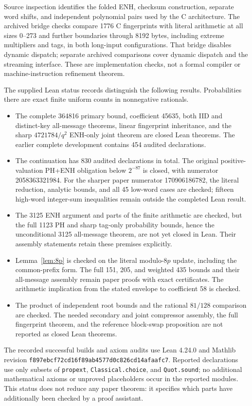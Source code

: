 Source inspection identifies the folded ENH, checksum construction, separate word shifts, and independent polynomial pairs used by the C architecture. The archived bridge checks compare 1776 C fingerprints with literal arithmetic at all sizes 0--273 and further boundaries through 8192 bytes, including extreme multipliers and tags, in both long-input configurations. That bridge disables dynamic dispatch; separate archived comparisons cover dynamic dispatch and the streaming interface. These are implementation checks, not a formal compiler or machine-instruction refinement theorem.

The supplied Lean status records\cite{leanstatus} distinguish the following results. Probabilities there are exact finite uniform counts in nonnegative rationals.
\begin{itemize}
\item The complete 364816 primary bound, coefficient 45635, both IID and distinct-key all-message theorems, linear fingerprint inheritance, and the sharp $4721784/q^2$ ENH-only joint theorem are closed Lean theorems. The earlier complete development contains 454 audited declarations.
\item The continuation has 830 audited declarations in total. The original positive-valuation PH+ENH obligation below $2^{-87}$ is closed, with numerator 2058363321984. For the sharper paper numerator 170906186782, the literal reduction, analytic bounds, and all 45 low-word cases are checked; fifteen high-word integer-sum inequalities remain outside the completed Lean result.
\item The 3125 ENH argument and parts of the finite arithmetic are checked, but the full 1123 PH and sharp tag-only probability bounds, hence the unconditional 3125 all-message theorem, are not yet closed in Lean. Their assembly statements retain these premises explicitly.
\item Lemma~\ref{lem:8p} is checked on the literal modulo-$8p$ update, including the common-prefix form. The full 151, 205, and weighted 435 bounds and their all-message assembly remain paper proofs with exact certificates. The arithmetic implication from the stated envelope to coefficient 58 is checked.
\item The product of independent root bounds and the rational $81/128$ comparison are checked. The needed secondary and joint compressor assembly, the full fingerprint theorem, and the reference block-swap proposition are not reported as closed Lean theorems.
\end{itemize}
The recorded successful builds and axiom audits use Lean 4.24.0 and Mathlib revision \texttt{f897ebcf72cd16f8}\allowbreak\texttt{9ab4577d0c826cd14afaafc7}. Reported declarations use only subsets of \texttt{propext}, \texttt{Classical.choice}, and \texttt{Quot.sound}; no additional mathematical axioms or unproved placeholders occur in the reported modules. This status does not reduce any paper theorem: it specifies which parts have additionally been checked by a proof assistant.

